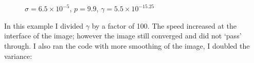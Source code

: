 \documentclass[margin=1in,12pt,3p]{elsarticle}
\begin{document}
\begin{figure}[h!]
  \centering
  \hfill
  \\
  \\
  \caption{$\sigma = 6.5\times 10^{-5}$, $p = 9.9$, $\gamma=5.5\times 10^{-15.25}$}
\end{figure}
In this example I divided $\gamma$ by a factor of 100. The speed increased at the interface of the image; however the image still converged and did not `pass' through. I also ran the code with more smoothing of the image, I doubled the variance: 
\clearpage
\end{document}
